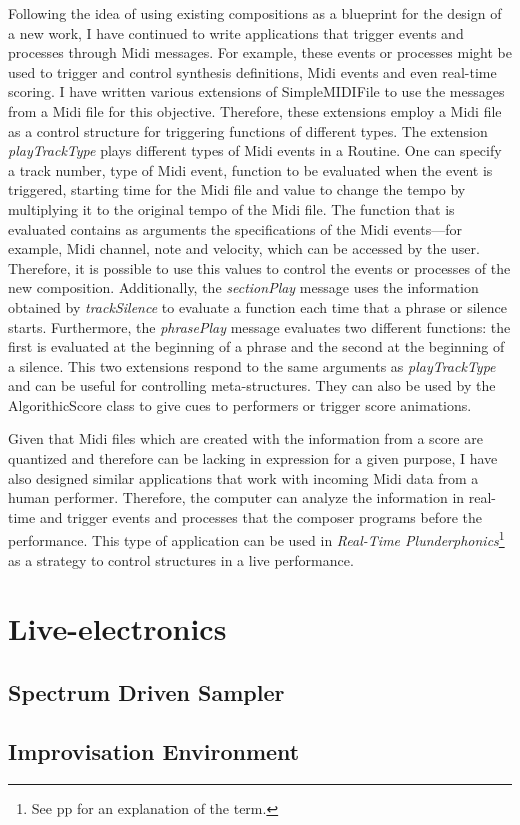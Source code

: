 Following the idea of using existing compositions as a blueprint for the design of a new work, I have continued to write applications that trigger events and processes through Midi messages. For example, these events or processes might be used to trigger and control synthesis definitions, Midi events and even real-time scoring. I have written various extensions of SimpleMIDIFile to use the messages from a Midi file for this objective. Therefore, these extensions employ a Midi file as a control structure for triggering functions of different types.
The extension \emph{playTrackType} plays different types of Midi events in a Routine. One can specify a track number, type of Midi event, function to be evaluated when the event is triggered, starting time for the Midi file and  value to change the tempo by multiplying it to the original tempo of the Midi file. The function that is evaluated contains as arguments the specifications of the Midi events---for example, Midi channel, note and velocity, which can be accessed by the user. Therefore, it is possible to use this values to control the events or processes of the new composition. Additionally, the \emph{sectionPlay} message uses the information obtained by \emph{trackSilence} to evaluate a function each time that a phrase or silence starts. Furthermore, the \emph{phrasePlay} message evaluates two different functions: the first is evaluated at the beginning of a phrase and the second at the beginning of a silence. This two extensions respond to the same arguments as \emph{playTrackType} and can be useful for controlling meta-structures. They can also be used by the AlgorithicScore class to give cues to performers or trigger score animations. 

Given that Midi files which are created with the information from a score are quantized and therefore can be lacking in expression for a given purpose, I have also designed similar applications that work with incoming Midi data from a human performer. Therefore, the computer can analyze the information in real-time and trigger events and processes that the composer programs before the performance. This type of application can be used in \emph{Real-Time Plunderphonics}\footnote{See pp  for an explanation of  the term.} as a strategy to control structures in a live performance.

\section{Live-electronics}

\subsection{Spectrum Driven Sampler}

\subsection{Improvisation Environment}

\label{ch:compapp}